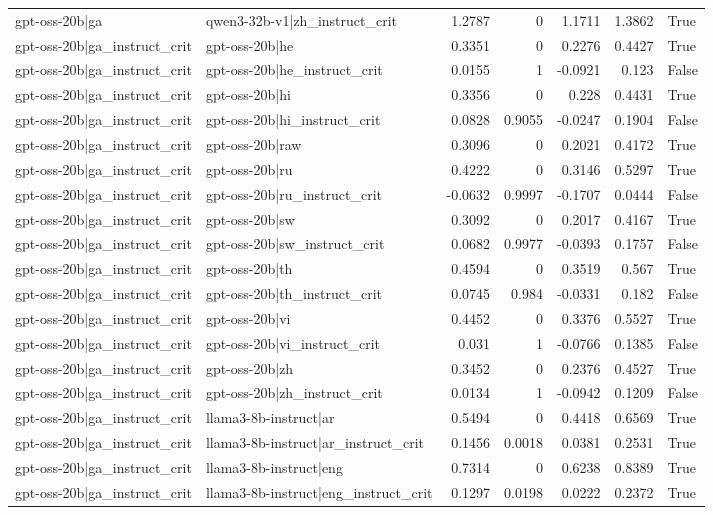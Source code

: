 \begin{table}
\begin{tabular}{l l r r r r l}
gpt-oss-20b|ga & qwen3-32b-v1|zh_instruct_crit & 1.2787 & 0 & 1.1711 & 1.3862 & True \\
gpt-oss-20b|ga_instruct_crit & gpt-oss-20b|he & 0.3351 & 0 & 0.2276 & 0.4427 & True \\
gpt-oss-20b|ga_instruct_crit & gpt-oss-20b|he_instruct_crit & 0.0155 & 1 & -0.0921 & 0.123 & False \\
gpt-oss-20b|ga_instruct_crit & gpt-oss-20b|hi & 0.3356 & 0 & 0.228 & 0.4431 & True \\
gpt-oss-20b|ga_instruct_crit & gpt-oss-20b|hi_instruct_crit & 0.0828 & 0.9055 & -0.0247 & 0.1904 & False \\
gpt-oss-20b|ga_instruct_crit & gpt-oss-20b|raw & 0.3096 & 0 & 0.2021 & 0.4172 & True \\
gpt-oss-20b|ga_instruct_crit & gpt-oss-20b|ru & 0.4222 & 0 & 0.3146 & 0.5297 & True \\
gpt-oss-20b|ga_instruct_crit & gpt-oss-20b|ru_instruct_crit & -0.0632 & 0.9997 & -0.1707 & 0.0444 & False \\
gpt-oss-20b|ga_instruct_crit & gpt-oss-20b|sw & 0.3092 & 0 & 0.2017 & 0.4167 & True \\
gpt-oss-20b|ga_instruct_crit & gpt-oss-20b|sw_instruct_crit & 0.0682 & 0.9977 & -0.0393 & 0.1757 & False \\
gpt-oss-20b|ga_instruct_crit & gpt-oss-20b|th & 0.4594 & 0 & 0.3519 & 0.567 & True \\
gpt-oss-20b|ga_instruct_crit & gpt-oss-20b|th_instruct_crit & 0.0745 & 0.984 & -0.0331 & 0.182 & False \\
gpt-oss-20b|ga_instruct_crit & gpt-oss-20b|vi & 0.4452 & 0 & 0.3376 & 0.5527 & True \\
gpt-oss-20b|ga_instruct_crit & gpt-oss-20b|vi_instruct_crit & 0.031 & 1 & -0.0766 & 0.1385 & False \\
gpt-oss-20b|ga_instruct_crit & gpt-oss-20b|zh & 0.3452 & 0 & 0.2376 & 0.4527 & True \\
gpt-oss-20b|ga_instruct_crit & gpt-oss-20b|zh_instruct_crit & 0.0134 & 1 & -0.0942 & 0.1209 & False \\
gpt-oss-20b|ga_instruct_crit & llama3-8b-instruct|ar & 0.5494 & 0 & 0.4418 & 0.6569 & True \\
gpt-oss-20b|ga_instruct_crit & llama3-8b-instruct|ar_instruct_crit & 0.1456 & 0.0018 & 0.0381 & 0.2531 & True \\
gpt-oss-20b|ga_instruct_crit & llama3-8b-instruct|eng & 0.7314 & 0 & 0.6238 & 0.8389 & True \\
gpt-oss-20b|ga_instruct_crit & llama3-8b-instruct|eng_instruct_crit & 0.1297 & 0.0198 & 0.0222 & 0.2372 & True \\

\end{tabular}
\end{table}
